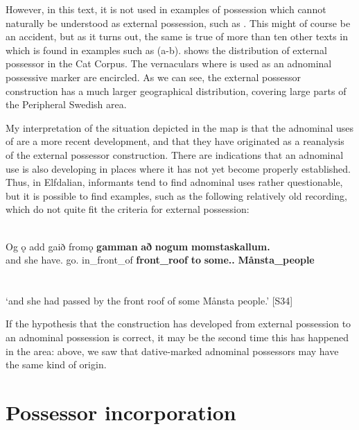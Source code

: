 However, in this text, it is not used in examples of possession which cannot naturally be understood as external possession, such as . This might of course be an accident, but as it turns out, the same is true of more than ten other texts in which  is found in examples such as (a-b).  shows the distribution of external possessor  in the Cat Corpus. The vernaculars where  is used as an adnominal possessive marker are encircled. As we can see, the external possessor construction has a much larger geographical distribution, covering large parts of the Peripheral Swedish area. 

My interpretation of the situation depicted in the map is that the adnominal uses of are a more recent development, and that they have originated as a reanalysis of the external possessor construction. There are indications that an adnominal use is also developing in places where it has not yet become properly established. Thus, in Elfdalian, informants tend to find adnominal uses rather questionable, but it is possible to find examples, such as the following relatively old recording, which do not quite fit the criteria for external possession: 

\ea\label{}
\\
\gll Og  ǫ  add  gaið fromǫ  \textbf{gamman} \textbf{að} \textbf{nogum} \textbf{momstaskallum.}\\
and  she  have.{\pst}  go.{\supp} in\_front\_of   \textbf{front\_roof} \textbf{to} \textbf{some.{}.{\pl}} \textbf{Månsta\_people}\\
\gll\\
\\
\glt ‘and she had passed by the front roof of some Månsta people.’ [S34]
\z

If the hypothesis that the  construction has developed from external possession to an adnominal possession is correct, it may be the second time this has happened in the area: above, we saw that dative-marked adnominal possessors may have the same kind of origin. 

\section{Possessor incorporation}

